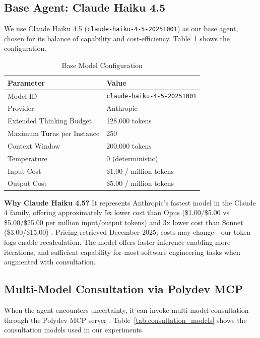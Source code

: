 \documentclass[11pt,a4paper]{article}
\begin{document}
\subsection{Base Agent: Claude Haiku 4.5}

We use Claude Haiku 4.5 (\texttt{claude-haiku-4-5-20251001}) as our base agent, chosen for its balance of capability and cost-efficiency. Table~\ref{tab:model_config} shows the configuration.

\begin{table}[h]
\centering
\caption{Base Model Configuration}
\label{tab:model_config}
\begin{tabular}{ll}
\toprule
\textbf{Parameter} & \textbf{Value} \\
\midrule
Model ID & \texttt{claude-haiku-4-5-20251001} \\
Provider & Anthropic \\
Extended Thinking Budget & 128,000 tokens \\
Maximum Turns per Instance & 250 \\
Context Window & 200,000 tokens \\
Temperature & 0 (deterministic) \\
Input Cost & \$1.00 / million tokens \\
Output Cost & \$5.00 / million tokens \\
\bottomrule
\end{tabular}
\end{table}

\textbf{Why Claude Haiku 4.5?} It represents Anthropic's fastest model in the Claude 4 family, offering approximately 5x lower cost than Opus (\$1.00/\$5.00 vs \$5.00/\$25.00 per million input/output tokens) and 3x lower cost than Sonnet (\$3.00/\$15.00) \citep{anthropic2024pricing}. Pricing retrieved December 2025; costs may change---our token logs enable recalculation. The model offers faster inference enabling more iterations, and sufficient capability for most software engineering tasks when augmented with consultation.

\subsection{Multi-Model Consultation via Polydev MCP}

When the agent encounters uncertainty, it can invoke multi-model consultation through the Polydev MCP server \citep{anthropic2024mcp,linuxfoundation2025mcp}. Table~\ref{tab:consultation_models} shows the consultation models used in our experiments.
\end{document}
